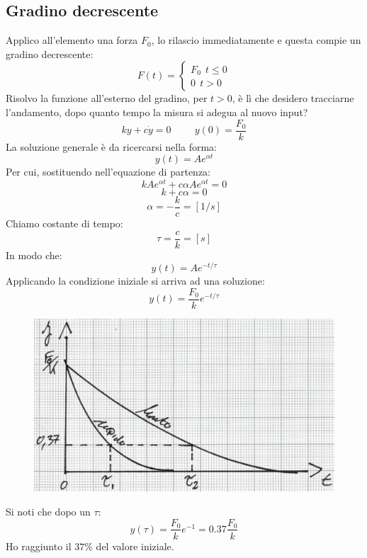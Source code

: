 \documentclass[a4paper, 15pt]{article}
\begin{document}
\subsection{Gradino decrescente} 	
\begin{adjustwidth}{2in}{}
	Applico all'elemento una forza $F_0$, lo rilascio immediatamente e questa compie un gradino decrescente:
	\[ F(t) = \begin{cases}
		F_0 ~~ t \leq 0 \\
		0 ~~ t>0
	\end{cases}\]
	Risolvo la funzione all'esterno del gradino, per $t>0$, è lì che desidero tracciarne l'andamento, dopo quanto tempo la misura si adegua al nuovo input? 
	\[ ky + c\dot{y} = 0 \hspace{1cm} y(0) = \dfrac{F_0}{k}\]
	La soluzione generale è da ricercarsi nella forma: 
	\[  y(t) = Ae^{\alpha t}\]
	Per cui, sostituendo nell'equazione di partenza: 
	\[ kAe^{\alpha t} + c\alpha Ae^{\alpha t} = 0 \]
	\[ k + c\alpha  = 0 \]
	\[ \alpha  = -\dfrac{k}{c} = [ 1/s ]  \]
	Chiamo costante di tempo:
	\[ \tau = \dfrac{c}{k} = [ s ] \]
	In modo che: 
	\[  y(t) = Ae^{-t/\tau}\]
	Applicando la condizione iniziale si arriva ad una soluzione:
	\[  y(t) = \dfrac{F_0}{k}e^{-t/\tau}\]	
\begin{figure}[H]
	\centering
	\includegraphics[width=0.4\linewidth]{fig/mm4}
	\label{fig:mm4}
\end{figure}
	Si noti che dopo un $\tau$:
	\[  y(\tau) = \dfrac{F_0}{k}e^{-1} = 0.37\dfrac{F_0}{k} \]
	Ho raggiunto il $37\%$ del valore iniziale.  
\end{adjustwidth}
\end{document}
